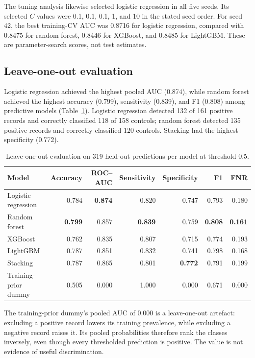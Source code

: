 The tuning analysis likewise selected logistic regression in all five seeds. Its selected $C$ values were 0.1, 0.1, 0.1, 1, and 10 in the stated seed order. For seed 42, the best training-CV AUC was 0.8716 for logistic regression, compared with 0.8475 for random forest, 0.8446 for XGBoost, and 0.8485 for LightGBM. These are parameter-search scores, not test estimates.

\subsection{Leave-one-out evaluation}
Logistic regression achieved the highest pooled AUC (0.874), while random forest achieved the highest accuracy (0.799), sensitivity (0.839), and F1 (0.808) among predictive models (Table~\ref{tab:building-lopo-results}). Logistic regression detected 132 of 161 positive records and correctly classified 118 of 158 controls; random forest detected 135 positive records and correctly classified 120 controls. Stacking had the highest specificity (0.772).

\begin{table}[tbp]
\centering
\footnotesize
\caption{Leave-one-out evaluation on 319 held-out predictions per model at threshold 0.5.}
\label{tab:building-lopo-results}
\begin{tabular}{@{}lrrrrrr@{}}
\toprule
Model & Accuracy & ROC--AUC & Sensitivity & Specificity & F1 & FNR \\
\midrule
Logistic regression & 0.784 & \textbf{0.874} & 0.820 & 0.747 & 0.793 & 0.180 \\
Random forest & \textbf{0.799} & 0.857 & \textbf{0.839} & 0.759 & \textbf{0.808} & \textbf{0.161} \\
XGBoost & 0.762 & 0.835 & 0.807 & 0.715 & 0.774 & 0.193 \\
LightGBM & 0.787 & 0.851 & 0.832 & 0.741 & 0.798 & 0.168 \\
Stacking & 0.787 & 0.865 & 0.801 & \textbf{0.772} & 0.791 & 0.199 \\
\midrule
Training-prior dummy & 0.505 & 0.000 & 1.000 & 0.000 & 0.671 & 0.000 \\
\bottomrule
\end{tabular}
\end{table}
The training-prior dummy's pooled AUC of 0.000 is a leave-one-out artefact: excluding a positive record lowers its training prevalence, while excluding a negative record raises it. Its pooled probabilities therefore rank the classes inversely, even though every thresholded prediction is positive. The value is not evidence of useful discrimination.

